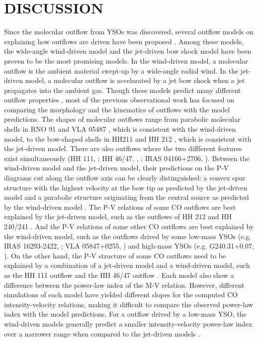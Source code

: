 \section{DISCUSSION}\label{discussion}
Since the molecular outflow from YSOs was discovered, several outflow models on explaining how outflows are driven have been proposed \citep{2007prpl.conf..245A}. Among these models, the wide-angle wind-driven model \citep{1991ApJ...370L..31S,1996ApJ...472..211L, 2001ApJ...557..429L} and the jet-driven bow shock model \citep{ 1993A&A...278..267R, 1993ApJ...414..230M, 2001ApJ...557..429L} have been proven to be the most promising models.
In the wind-driven model, a molecular outflow is the ambient material swept-up by a wide-angle radial wind. In the jet-driven model, a molecular outflow is accelarated by a jet bow shock when a jet propagates into the ambient gas. Though these models predict many different outflow properties \citep{2007prpl.conf..245A}, most of the previous observational work has focused on comparing the morphology and the kinematics of outflows with the model predictions. The shapes of molecular outflows range from parabolic molecular shells in RNO 91 and VLA 05487 \citep{2000ApJ...542..925L}, which is consistent with the wind-driven model, to the bow-shaped shells in HH211 \citep{1999A&A...343..571G} and HH 212 \citep{2000ApJ...542..925L}, which is consistent with the jet-driven model. There are also outflows where the two diffferent features exist simultaneously (HH 111, \citet{2000ApJ...542..925L}; HH 46/47, \citet{2013ApJ...774...39A}, \citet{2016ApJ...832..158Z}; IRAS 04166+2706, \citet{2009A&A...495..169S}).
Between the wind-driven model and the jet-driven model, their predictions on the P-V diagrams cut along the outflow axis can be clearly distinguished: a convex spur structure with the highest velocity at the bow tip as predicted by the jet-driven model and a parabolic structure originating from the central source as predicted by the wind-driven model \citep{2001ApJ...557..429L}. The P-V relations of some CO outflows are best explained by the jet-driven model, such as the outflows of HH 212 and HH 240/241 \citep{2000ApJ...542..925L}. And the P-V relations of some other CO outflows are best explained by the wind-driven model, such as the outflows drived by some low-mass YSOs (e.g. IRAS 16293-2422, \citet{2008ApJ...675..454Y}; VLA 05847+0255, \citet{2000ApJ...542..925L}) and high-mass YSOs (e.g. G240.31+0.07, \citet{2009ApJ...696...66Q}). On the other hand, the P-V structure of some CO outflows need to be explained by a combination of a jet-driven model and a wind-driven model, such as the HH 111 outflow \citep{2000ApJ...542..925L} and the HH 46/47 outflow \citep{2013ApJ...774...39A}. Each model also show a difference between the power-law index of the M-V relation. However, different simulations of each model have yielded different slopes for the computed CO intensity-velocity relations, making it difficult to compare the observed power-law index with the model predictions. For a outflow drived by a low-mass YSO, the wind-driven models generally predict a smaller intensity-velocity power-law index over a narrower range when compared to the jet-driven models \citep{2007prpl.conf..245A}.

